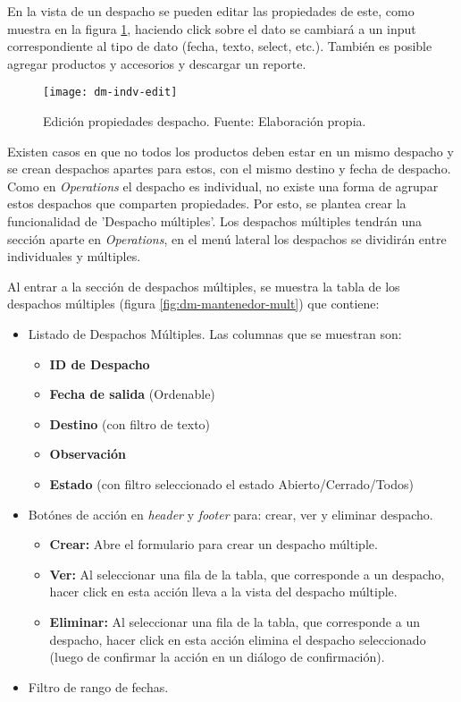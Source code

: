 En la vista de un despacho se pueden editar las propiedades de este, como muestra en la figura \ref{fig:dm-indv-edit}, haciendo click sobre el dato se cambiará a un input correspondiente al tipo de dato (fecha, texto, select, etc.). También es posible agregar productos y accesorios y descargar un reporte.

\begin{figure}[H]
	\centering
	\texttt{[image: dm-indv-edit]}
	\caption{\label{fig:dm-indv-edit} Edición propiedades despacho. Fuente: Elaboración propia.}
\end{figure}
Existen casos en que no todos los productos deben estar en un mismo despacho y se crean despachos apartes para estos, con el mismo destino y fecha de despacho.
Como en \textit{Operations} el despacho es individual, no existe una forma de agrupar estos despachos que comparten propiedades. Por esto, se plantea crear la funcionalidad de 'Despacho múltiples'. 
Los despachos múltiples tendrán una sección aparte en \textit{Operations}, en el menú lateral los despachos se dividirán entre individuales y múltiples.

Al entrar a la sección de despachos múltiples, se muestra la tabla de los despachos múltiples (figura \ref{fig:dm-mantenedor-mult}) que contiene:
\begin{itemize}
    \item Listado de Despachos Múltiples. Las columnas que se muestran son:
    \begin{itemize}
        \item \textbf{ID de Despacho}
        \item \textbf{Fecha de salida} (Ordenable)
        \item \textbf{Destino} (con filtro de texto)
        \item \textbf{Observación}
        \item \textbf{Estado} (con filtro seleccionado el estado Abierto/Cerrado/Todos)
    \end{itemize}
    \item Botónes de acción en \textit{header} y \textit{footer} para: crear, ver y eliminar despacho.
    \begin{itemize}
        \item \textbf{Crear:} Abre el formulario para crear un despacho múltiple.
        \item \textbf{Ver:} Al seleccionar una fila de la tabla, que corresponde a un despacho, hacer click en esta acción lleva a la vista del despacho múltiple.
        \item \textbf{Eliminar:} Al seleccionar una fila de la tabla, que corresponde a un despacho, hacer click en esta acción elimina el despacho seleccionado (luego de confirmar la acción en un diálogo de confirmación).
    \end{itemize}
    \item Filtro de rango de fechas.
\end{itemize}

